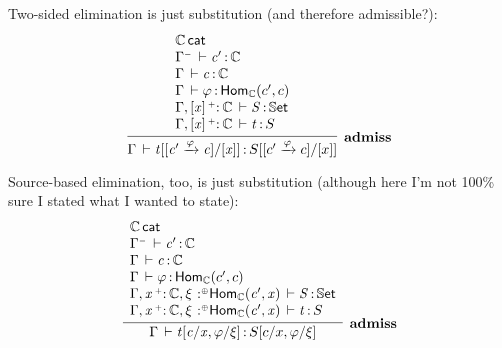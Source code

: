 \documentclass[11pt]{article}
\theoremstyle{plain}
\begin{document}

Two-sided elimination is just substitution (and therefore admissible?):
\begin{equation}
	\infer[\admiss]{
		\oftp{\Gamma}{t[\substtw{c'}{c}{\vfi}{x}]}{S[\substtw{c'}{c}{\vfi}{x}]}
	}{ \begin{array}{l}
		\wfdtp{\C} \\
		\oftp{\Gamma^\con}{c'}{\C} \\
		\oftp{\Gamma}{c}{\C} \\
		\oftp{\Gamma}{\vfi}{\Hom{\C}{c'}{c}} \\
		\oftp{\Gamma, \twcatvar{x}{\co}{\C} }{S}{\types} \\
		\oftp{\Gamma, \twcatvar{x}{\co}{\C} }{t}{S}
	\end{array} }
\end{equation}

Source-based elimination, too, is just substitution (although here I'm not 100\% sure I stated what I wanted to state):
\begin{equation}
	\infer[\admiss]{
		\oftp{\Gamma}{t[c/x, \vfi/\xi]}{S[c/x, \vfi/\xi]}
	}{ \begin{array}{l}
		\wfdtp{\C} \\
		\oftp{\Gamma^\con}{c'}{\C} \\
		\oftp{\Gamma}{c}{\C} \\
		\oftp{\Gamma}{\vfi}{\Hom{\C}{c'}{c}} \\
		\oftp{\Gamma, \catvar{x}{\co}{\C}, \tpvar{\xi}{\coc}{\Hom{\C}{c'}{x}} }{S}{\types} \\
		\oftp{\Gamma, \catvar{x}{\co}{\C}, \tpvar{\xi}{\coc}{\Hom{\C}{c'}{x}} }{t}{S}
	\end{array} }
\end{equation}
\end{document}
